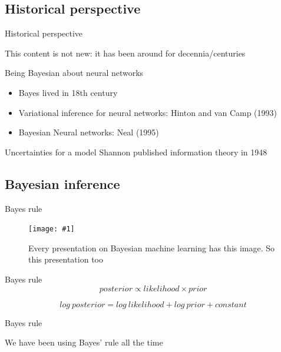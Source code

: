 \documentclass{beamer}
\newcommand{\fitfigure}[1]{\centering\texttt{[image: \#1]}}
\begin{document}
\subsection{Historical perspective}
\begin{frame}{Historical perspective}
	\centerline{This content is not new: it has been around for decennia/centuries}
	\centerline{  }
		
	\begin{block}{Being Bayesian about neural networks}
		\begin{itemize}
			\item Bayes lived in 18th century
			\item Variational inference for neural networks: Hinton and van Camp (1993)
			\item Bayesian Neural networks: Neal (1995)
		\end{itemize}
	\end{block}
		
	\begin{block}{Uncertainties for a model}
		Shannon published information theory in 1948
	\end{block}
		
\end{frame}

\subsection{Bayesian inference}
\begin{frame}{Bayes rule}
	\begin{figure}
		\fitfigure{im/bayes_neon.jpg}
		\caption{Every presentation on Bayesian machine learning has this image. So this presentation too}
	\end{figure}
\end{frame}

\begin{frame}{Bayes rule}
	\begin{equation*}
		posterior \propto likelihood \times prior
	\end{equation*}
	\centerline{  }
	\begin{equation*}
		log \ posterior =  log \ likelihood + log \ prior + constant
	\end{equation*}
\end{frame}

\begin{frame}{Bayes rule}
	\centerline{We have been using Bayes' rule all the time}
\end{frame}
\end{document}
